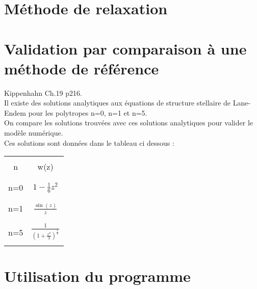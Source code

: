 \documentclass[a4paper,10pt]{article}
\begin{document}
\section{Méthode de relaxation}



\section{Validation par comparaison à une méthode de référence}
Kippenhahn Ch.19 p216.\\
Il existe des solutions analytiques aux équations de structure stellaire de Lane-Endem pour les polytropes n=0, n=1 et n=5.\\
On compare les solutions trouvées avec ces solutions analytiques pour valider le modèle numérique.\\
Ces solutions sont données dans le tableau ci dessous :\\
\begin{tabular}{cc}
\hline
\\
n & w(z)\\
\\
\hline
\\
n=0 & $1 - \frac{1}{6} z^2$\\
\\
\hline
\\
n=1 & $\frac{\sin(z)}{z}$\\
\\
\hline
\\
n=5 & $\frac{1}{(1+\frac{z^2}{3})^{\frac{1}{2}}}$\\
\\
\hline
\end{tabular}

\section{Utilisation du programme}
\end{document}
